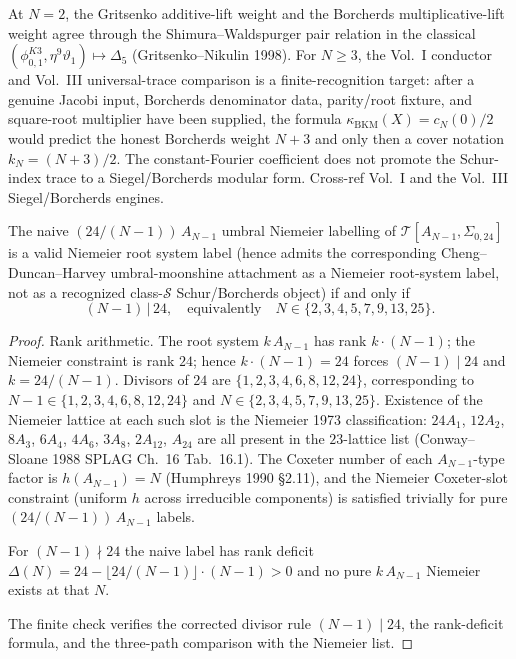 \begin{remark}
\label{rem:wa-cross-volume}
At $N = 2$, the Gritsenko additive-lift weight and the Borcherds
multiplicative-lift weight agree through the Shimura--Waldspurger pair
relation in the classical
$(\phi_{0,1}^{K3}, \eta^9 \vartheta_1) \mapsto \Delta_5$
(Gritsenko--Nikulin 1998). For $N \ge 3$, the Vol.~I conductor and
Vol.~III universal-trace comparison is a finite-recognition target:
after a genuine Jacobi input, Borcherds denominator data, parity/root
fixture, and square-root multiplier have been supplied, the formula
$\kappa_{\mathrm{BKM}}(X)=c_N(0)/2$ would predict the honest Borcherds
weight $N+3$ and only then a cover notation $k_N=(N+3)/2$. The
constant-Fourier coefficient does not promote the Schur-index trace to a
Siegel/Borcherds modular form. Cross-ref Vol.~I and the Vol.~III
Siegel/Borcherds engines.
\end{remark}

\begin{theorem}
\label{thm:wa-divisor-rule}
The naive $(24/(N-1))\,A_{N-1}$ umbral Niemeier labelling of
$\mathcal T[A_{N-1}, \Sigma_{0, 24}]$ is a valid Niemeier root
system label (hence admits the corresponding Cheng--Duncan--Harvey
umbral-moonshine attachment as a Niemeier root-system label, not as a
recognized class-$\mathcal S$ Schur/Borcherds object) if and only if
\[
 (N - 1) \,\big|\, 24,
 \quad\text{equivalently}\quad
 N \in \{2, 3, 4, 5, 7, 9, 13, 25\}.
\]
\end{theorem}

\begin{proof}
Rank arithmetic. The root system $k\,A_{N-1}$ has rank
$k \cdot (N - 1)$; the Niemeier constraint is rank $24$; hence
$k \cdot (N - 1) = 24$ forces $(N - 1) \mid 24$ and
$k = 24/(N - 1)$. Divisors of $24$ are $\{1, 2, 3, 4, 6, 8, 12, 24\}$,
corresponding to $N - 1 \in \{1, 2, 3, 4, 6, 8, 12, 24\}$ and
$N \in \{2, 3, 4, 5, 7, 9, 13, 25\}$. Existence of the Niemeier
lattice at each such slot is the Niemeier 1973 classification:
$24 A_1$, $12 A_2$, $8 A_3$, $6 A_4$, $4 A_6$, $3 A_8$, $2 A_{12}$,
$A_{24}$ are all present in the $23$-lattice list (Conway--Sloane
1988 SPLAG Ch.\ 16 Tab.\ 16.1). The Coxeter number of each
$A_{N-1}$-type factor is $h(A_{N-1}) = N$ (Humphreys 1990 \S 2.11),
and the Niemeier Coxeter-slot constraint (uniform $h$ across
irreducible components) is satisfied trivially for pure
$(24/(N-1))\,A_{N-1}$ labels.

For $(N - 1) \nmid 24$ the naive label has rank deficit
$\Delta(N) = 24 - \lfloor 24/(N - 1) \rfloor \cdot (N - 1) > 0$
and no pure $k\,A_{N-1}$ Niemeier exists at that $N$.

The finite check verifies the corrected divisor rule
$(N-1)\mid 24$, the rank-deficit formula, and the three-path
comparison with the Niemeier list.
\end{proof}

